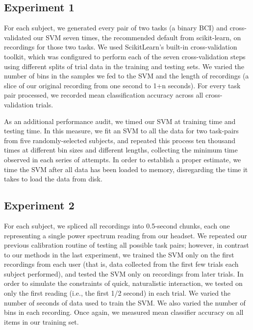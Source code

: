 
\subsection{Experiment 1}

For each subject, we generated every pair of two tasks (a binary BCI) and cross-validated our SVM seven times, the recommended default from scikit-learn, on recordings for those two tasks. We used ScikitLearn's built-in cross-validation toolkit, which was configured to perform each of the seven cross-validation steps using different splits of trial data in the training and testing sets. We varied the number of bins in the samples we fed to the SVM and the length of recordings (a slice of our original recording from one second to 1+n seconds). For every task pair processed, we recorded mean classification accuracy across all cross-validation trials.

As an additional performance audit, we timed our SVM at training time and testing time. In this measure, we fit an SVM to all the data for two task-pairs from five randomly-selected subjects, and repeated this process ten thousand times at different bin sizes and different lengths, collecting the minimum time observed in each series of attempts. In order to establish a proper estimate, we time the SVM after all data has been loaded to memory, disregarding the time it takes to load the data from disk.

\subsection{Experiment 2}

For each subject, we spliced all recordings into 0.5-second chunks, each one representing a single power spectrum reading from our headset. We repeated our previous calibration routine of testing all possible task pairs; however, in contrast to our methods in the last experiment, we trained the SVM only on the first recordings from each user (that is, data collected from the first few trials each subject performed), and tested the SVM only on recordings from later trials. In order to simulate the constraints of quick, naturalistic interaction, we tested on only the first reading (i.e., the first 1/2 second) in each trial. We varied the number of seconds of data used to train the SVM. We also varied the number of bins in each recording. Once again, we measured mean classifier accuracy on all items in our training set.

